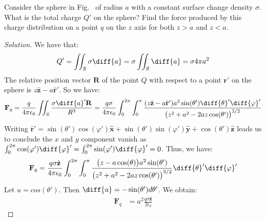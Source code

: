 \documentclass[crop=false,class=article,oneside]{standalone}
\begin{document}
    \begin{problem}[Wangsness 2-8]
        \label{problem:EMAG_wangsness_2_8}
        Consider the sphere in Fig.~
        of radius $a$ with a constant surface change density
        $\sigma$. What is the total charge $Q'$ on the sphere?
        Find the force produced by this charge distribution on a
        point $q$ on the $z$ axis for both $z>a$ and $z<a$.
    \end{problem}
    \begin{proof}[Solution]
        We have that:
        \begin{equation*}
            Q'=\iint_{S}\sigma\diff{a}
            =\sigma\iint_{S}\diff{a}
            =\sigma{4}\pi{a^{2}}
        \end{equation*}
        The relative position vector $\mathbf{R}$ of the point
        $Q$ with respect to a point $\mathbf{r}'$ on the sphere
        is $z\hat{\mathbf{z}}-a\hat{\mathbf{r}}'$. So we have:
        \begin{equation*}
            \mathbf{F}_{q}
            =\frac{q}{4\pi\epsilon_{0}}\iint_{S}
            \frac{\sigma\diff{a}'\mathbf{R}}{R^{3}}
            =\frac{q\sigma}{4\pi\epsilon_{0}}
            \int_{0}^{2\pi}\int_{0}^{\pi}
            \frac{(z\hat{\mathbf{z}}-a\hat{\mathbf{r}}')a^{2}
                  \sin(\theta')\diff{\theta}'\diff{\varphi}'}
                 {\big(z^2+a^2-2az\cos(\theta')\big)^{3/2}}
        \end{equation*}
        Writing
        $\hat{\mathbf{r}}'%
         =\sin(\theta')\cos(\varphi')\hat{\mathbf{x}}%
         +\sin(\theta')\sin(\varphi')\hat{\mathbf{y}}%
         +\cos(\theta')\hat{\mathbf{z}}$
        leads us to conclude the $x$ and $y$ component vanish as
        $\int_{0}^{2\pi}\cos(\varphi')\diff{\varphi}'%
         =\int_{0}^{2\pi}\sin(\varphi')\diff{\varphi}'%
         =0$.
        Thus, we have:
        \begin{equation*}
            \mathbf{F}_{q}
            =\frac{q\sigma\hat{\mathbf{z}}}{4\pi\epsilon_{0}}
            \int_{0}^{2\pi}\int_{0}^{\pi}
            \frac{\big(z-a\cos(\theta)\big)a^{2}
                  \sin(\theta')}
                 {\big(z^{2}+a^{2}-2az\cos(\theta')\big)^{3/2}}
            \diff{\theta}'\diff{\varphi}'
        \end{equation*}
        Let $u=cos(\theta')$.
        Then $\diff{u}=-\sin(\theta')d\theta'$. We obtain:
        \begin{align*}
            \mathbf{F}_{q}
            &=a^{2}\frac{q\sigma \hat{\mathbf{z}}}{2\epsilon_{0}}

\end{align*}
\end{proof}
\end{document}
